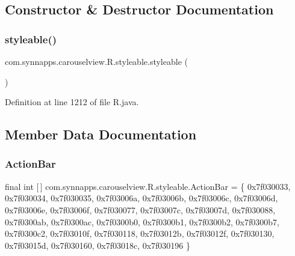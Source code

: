 \subsection{Constructor \& Destructor Documentation}
\mbox{\label{classcom_1_1synnapps_1_1carouselview_1_1_r_1_1styleable_af9f753a3b7718345c84ab1f1e632bab2}} 
\subsubsection{\texorpdfstring{styleable()}{styleable()}}
{\footnotesize\ttfamily com.\+synnapps.\+carouselview.\+R.\+styleable.\+styleable (\begin{DoxyParamCaption}{ }\end{DoxyParamCaption})\hspace{0.3cm}{\ttfamily [private]}}



Definition at line 1212 of file R.\+java.


\begin{DoxyCode}{0}

\end{DoxyCode}


\subsection{Member Data Documentation}
\mbox{\label{classcom_1_1synnapps_1_1carouselview_1_1_r_1_1styleable_aabf2a70615c0381390e9cfee5b3a8e95}} 
\subsubsection{\texorpdfstring{ActionBar}{ActionBar}}
{\footnotesize\ttfamily final int \mbox{[}$\,$\mbox{]} com.\+synnapps.\+carouselview.\+R.\+styleable.\+Action\+Bar = \{ 0x7f030033, 0x7f030034, 0x7f030035, 0x7f03006a, 0x7f03006b, 0x7f03006c, 0x7f03006d, 0x7f03006e, 0x7f03006f, 0x7f030077, 0x7f03007c, 0x7f03007d, 0x7f030088, 0x7f0300ab, 0x7f0300ac, 0x7f0300b0, 0x7f0300b1, 0x7f0300b2, 0x7f0300b7, 0x7f0300c2, 0x7f03010f, 0x7f030118, 0x7f03012b, 0x7f03012f, 0x7f030130, 0x7f03015d, 0x7f030160, 0x7f03018c, 0x7f030196 \}\hspace{0.3cm}{\ttfamily [static]}}



